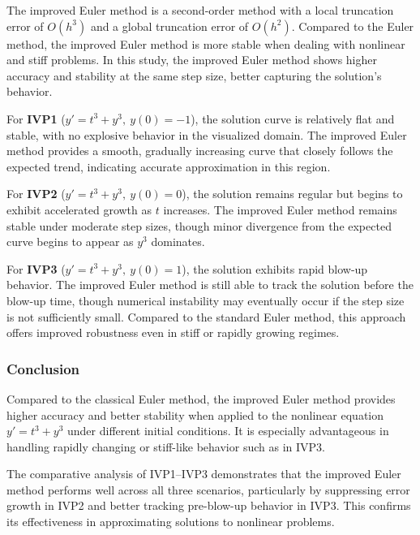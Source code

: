 \documentclass{article}
\begin{document}
The improved Euler method is a second-order method with a local truncation error of \( O(h^3) \) and a global truncation error of \( O(h^2) \). Compared to the Euler method, the improved Euler method is more stable when dealing with nonlinear and stiff problems. In this study, the improved Euler method shows higher accuracy and stability at the same step size, better capturing the solution's behavior.


For \textbf{IVP1} (\( y' = t^3 + y^3, \ y(0) = -1 \)), the solution curve is relatively flat and stable, with no explosive behavior in the visualized domain. The improved Euler method provides a smooth, gradually increasing curve that closely follows the expected trend, indicating accurate approximation in this region.

For \textbf{IVP2} (\( y' = t^3 + y^3, \ y(0) = 0 \)), the solution remains regular but begins to exhibit accelerated growth as \( t \) increases. The improved Euler method remains stable under moderate step sizes, though minor divergence from the expected curve begins to appear as \( y^3 \) dominates.

For \textbf{IVP3} (\( y' = t^3 + y^3, \ y(0) = 1 \)), the solution exhibits rapid blow-up behavior. The improved Euler method is still able to track the solution before the blow-up time, though numerical instability may eventually occur if the step size is not sufficiently small. Compared to the standard Euler method, this approach offers improved robustness even in stiff or rapidly growing regimes.


\subsubsection{Conclusion}

Compared to the classical Euler method, the improved Euler method provides higher accuracy and better stability when applied to the nonlinear equation \( y' = t^3 + y^3 \) under different initial conditions. It is especially advantageous in handling rapidly changing or stiff-like behavior such as in IVP3.

The comparative analysis of IVP1--IVP3 demonstrates that the improved Euler method performs well across all three scenarios, particularly by suppressing error growth in IVP2 and better tracking pre-blow-up behavior in IVP3. This confirms its effectiveness in approximating solutions to nonlinear problems.
\end{document}
